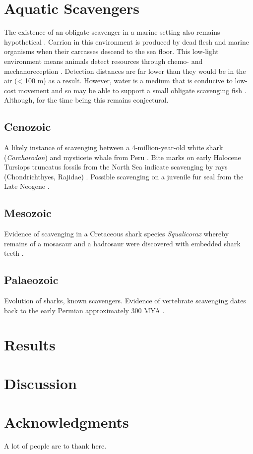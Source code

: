 \documentclass[a4paper,12pt]{article}
\begin{document}
\section{Aquatic Scavengers}
The existence of an obligate scavenger in a marine setting also remains hypothetical \citep{britton1994marine,smith2003ecology,ruxton2004energetic,ruxton2005searching}. 
Carrion in this environment is produced by dead flesh and marine organisms when their carcasses descend to the sea floor. 
This low-light environment means animals detect resources through chemo- and mechanoreception \citep{ruxton2004energetic}. 
Detection distances are far lower than they would be in the air (< 100 m) as a result. 
However, water is a medium that is conducive to low-cost movement \citep{tucker1975energetic} and so may be able to support a small obligate scavenging fish \citep{ruxton2004energetic,ruxton2005searching}. 
Although, for the time being this remains conjectural.

\subsection*{Cenozoic}
A likely instance of scavenging between a 4-million-year-old white shark (\textit{Carcharodon}) and mysticete whale from Peru \citep{ehret2009caught}.
Bite marks on early Holocene Tursiops truncatus fossils from the North Sea indicate scavenging by rays (Chondrichthyes, Rajidae) \citep{van2009bite}. 
Possible scavenging on a juvenile fur seal from the Late Neogene \citep{boessenecker2011mammalian}. 

\subsection*{Mesozoic}
Evidence of scavenging in a Cretaceous shark species \textit{Squalicorax} whereby remains of a mosasaur and a hadrosaur were discovered with embedded shark teeth \citep{schwimmer1997scavenging}. 
\subsection*{Palaeozoic}
Evolution of sharks, known scavengers. 
Evidence of vertebrate scavenging dates back to the early Permian approximately 300 MYA \citep{reisz2006articulated}.




\section*{Results}




\section*{Discussion}



\section*{Acknowledgments}

A lot of people are to thank here.


\newpage



\end{document}
